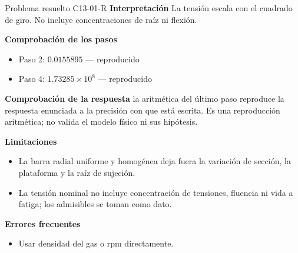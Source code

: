 \documentclass[10pt,openany]{book}
\begin{document}
\begin{studiumworked}{Problema resuelto C13-01-R}
\noindent\textbf{Interpretación}
La tensión escala con el cuadrado de giro. No incluye concentraciones de raíz ni flexión.

\noindent\textbf{Comprobación de los pasos}
\begin{itemize}
\item Paso 2: $0.0155895$ — reproducido
\item Paso 4: $1.73285\times 10^{8}$ — reproducido
\end{itemize}

\noindent\textbf{Comprobación de la respuesta} la aritmética del último paso reproduce la respuesta enunciada a la precisión con que está escrita. Es una reproducción aritmética; no valida el modelo físico ni sus hipótesis.

\noindent\textbf{Limitaciones}
\begin{itemize}
\item La barra radial uniforme y homogénea deja fuera la variación de sección, la plataforma y la raíz de sujeción.
\item La tensión nominal no incluye concentración de tensiones, fluencia ni vida a fatiga; los admisibles se toman como dato.
\end{itemize}

\noindent\textbf{Errores frecuentes}
\begin{itemize}
\item Usar densidad del gas o rpm directamente.
\end{itemize}
\end{studiumworked}
\end{document}
